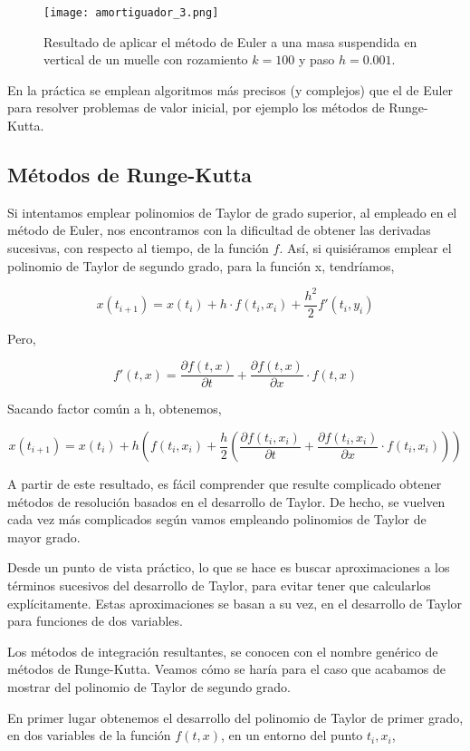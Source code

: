 \begin{figure}[h]
	\centering
	\texttt{[image: amortiguador\_3.png]}
	\caption{Resultado de aplicar el método de Euler a una masa suspendida en vertical de un muelle con rozamiento $k=100$ y paso $h=0.001$.}
	\label{fig:amortiguador3}
\end{figure}
\begin{paracol}{2}
En la práctica se emplean algoritmos más precisos (y complejos) que el de Euler para resolver problemas de valor inicial, por ejemplo los métodos de Runge-Kutta.

\subsection{Métodos de Runge-Kutta} 
Si intentamos emplear polinomios de Taylor de grado superior, al empleado en el método de Euler, nos encontramos con la dificultad de obtener las derivadas sucesivas, con respecto al tiempo, de la función $f$. Así, si quisiéramos emplear el polinomio de Taylor de segundo grado, para la función x, tendríamos,
\end{paracol}

\begin{equation*}
x(t_{i+1})=x(t_i)+h\cdot f(t_i,x_i)+\frac{h^2}{2}f'(t_i,y_i)
\end{equation*}
\begin{paracol}{2}
Pero,
\end{paracol}
\begin{equation*}
f'(t,x)=\frac{\partial f(t,x)}{\partial t}+\frac{\partial f(t,x)}{\partial x}\cdot f(t,x)
\end{equation*}
\begin{paracol}{2}
Sacando factor común a h, obtenemos,
\end{paracol}
\begin{equation*}
x(t_{i+1})=x(t_i)+h\left(f(t_i,x_i)+\frac{h}{2}\left(\frac{\partial f(t_i,x_i)}{\partial t}+\frac{\partial f(t_i,x_i)}{\partial x}\cdot f(t_i,x_i)\right)\right)
\end{equation*}
\begin{paracol}{2}
A partir de este resultado, es fácil comprender que resulte complicado obtener métodos de resolución basados en el desarrollo de Taylor. De hecho, se vuelven cada vez más complicados según vamos empleando polinomios de Taylor de mayor grado.

Desde un punto de vista práctico, lo que se hace es buscar aproximaciones a los términos sucesivos del desarrollo de Taylor, para evitar tener que calcularlos explícitamente. Estas aproximaciones se basan a su vez, en el desarrollo de Taylor para funciones de dos variables.

Los métodos de integración resultantes, se conocen con el nombre genérico de métodos de Runge-Kutta. Veamos cómo se haría para el caso que acabamos de mostrar del polinomio de Taylor de segundo grado.

En primer lugar obtenemos el desarrollo del polinomio de Taylor de primer grado, en dos variables de la función $f(t,x)$, en un entorno del punto $t_i,x_i$,
\end{paracol}

